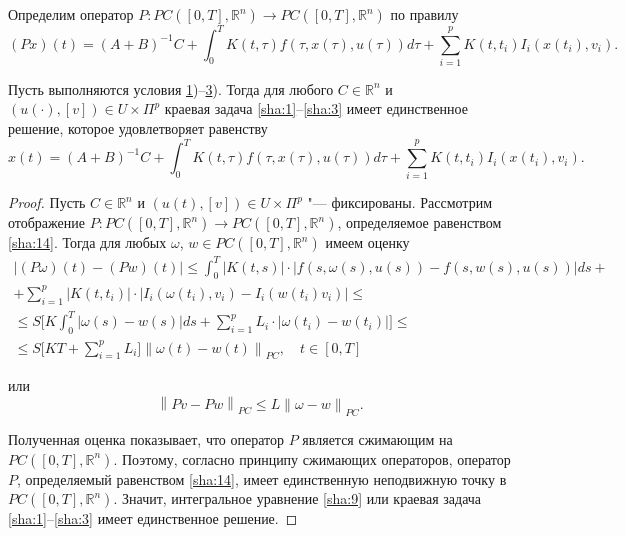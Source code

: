 \smallskip

Определим  оператор  $P:PC ([0, T], \mathbb R^{n} )\to PC ([0, T], \mathbb R^{n} )$  по правилу
\begin{equation}
\label{sha:14} 
(Px)(t)=(A+B)^{-1} C+\int _{0}^{T}K(t,\tau )f(\tau ,x(\tau ),u(\tau))d\tau  +
\sum _{i=1}^{p}K(t,t_{i} )I_{i} (x(t_{i} ),v_{i} ) .                               
\end{equation} 

\smallskip

\hypertarget{sha:th2}{}
\begin{theorem}[2]Пусть выполняются условия {\rm \hyperlink{sha:1)}{1})--\hyperlink{sha:3)}{3}).} Тогда для любого $C\in \mathbb R^{n} $ и  $(u(\cdot),[v])\in U\times \Pi ^{p} $ краевая задача \eqref{sha:1}--\eqref{sha:3} имеет единственное решение{\rm ,} которое удовлетворяет равенству 
\begin{equation} 
\label{sha:15} 
x(t)=(A+B)^{-1} C+\int _{0}^{T}K(t,\tau )f(\tau ,x(\tau ),u(\tau))d\tau  +\sum _{i=1}^{p}K(t,t_{i} )I_{i} (x(t_{i} ),v_{i} )  . 
\end{equation} 
\end{theorem}


\smallskip

\begin{proof} Пусть $C\in \mathbb R^{n} $ и $(u(t),[v])\in U\times \Pi ^{p} $ "--- фиксированы. Рассмотрим отображение $P:PC ([0, T], \mathbb R^{n} )\to PC ([0, T], \mathbb R^{n} )$, определяемое равенством \eqref{sha:14}. 
Тогда для любых $\omega$, $w\in PC ([0, T], \mathbb R^{n} )$ имеем оценку
\begin{multline}
\left|(P\omega )(t)-(Pw)(t)\right|\le \int _{0}^{T}|K(t,s)|\cdot|f(s,\omega (s),u(s))-f(s,w(s),u(s))|ds +
\\
+\sum _{i=1}^{p}\left|K(t,t_{i} )\right|\cdot \left|I_{i} (\omega (t_{i} ),v_{i} )-I_{i} (w(t_{i} )v_{i} )\right| \le 
\\
\le S \biggl[K\int _{0}^{T}\left|\omega (s)-w(s)\right|ds +  \sum _{i=1}^{p}L_{i} \cdot \left|\omega (t_{i} )-w(t_{i} )\right| \biggr]\le 
\\
\le S\biggl[KT+\sum _{i=1}^{p}L_{i}  \biggr]\left\| \omega (t)-w(t)\right\| _{PC} , \quad   t\in [0,T]
\label{sha:16}              
\end{multline} 

\pagebreak

\noindent
или 
\begin{equation} \label{sha:17} 
\left\| Pv-Pw\right\| _{PC} \le L\left\| \omega -w\right\| _{PC} .        
\end{equation} 

Полученная оценка показывает, что оператор $P$ является сжимающим на $PC([0, T], \mathbb R^{n} )$.
Поэтому, согласно принципу сжимающих операторов, оператор $P$, определяемый равенством \eqref{sha:14}, имеет единственную неподвижную точку в $PC ([0, T], \mathbb R^{n})$. 
Значит, интегральное уравнение \eqref{sha:9} или краевая задача \eqref{sha:1}--\eqref{sha:3} имеет единственное решение. \end{proof}

